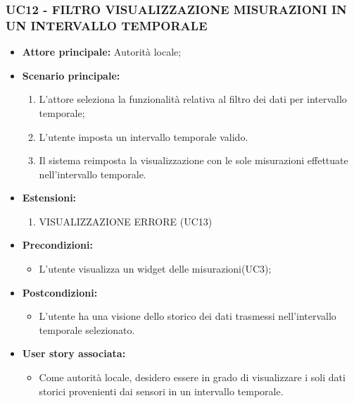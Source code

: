 \subsubsection{UC12 - FILTRO VISUALIZZAZIONE MISURAZIONI IN UN INTERVALLO TEMPORALE}
\begin{itemize}
    \item \textbf{Attore principale:} Autorità locale;
    \item \textbf{Scenario principale:}
          \begin{enumerate}
            \item L'attore seleziona la funzionalità relativa al filtro dei dati per intervallo temporale;
              \item L'utente imposta un intervallo temporale valido.
              \item Il sistema reimposta la visualizzazione con le sole misurazioni effettuate nell'intervallo temporale.
          \end{enumerate}
          \item \textbf{Estensioni:}
          \begin{enumerate}
              \item VISUALIZZAZIONE ERRORE (UC13)
          \end{enumerate}
    \item \textbf{Precondizioni:}
          \begin{itemize}
              \item  L'utente visualizza un widget delle misurazioni(UC3);
          \end{itemize}
    \item \textbf{Postcondizioni:}
          \begin{itemize}
              \item  L'utente ha una visione dello storico dei dati trasmessi nell'intervallo temporale selezionato.
          \end{itemize}
    \item \textbf{User story associata:}
          \begin{itemize}
            \item Come autorità locale, desidero essere in grado di visualizzare i soli dati storici provenienti dai sensori in un intervallo temporale.
          \end{itemize}
\end{itemize}